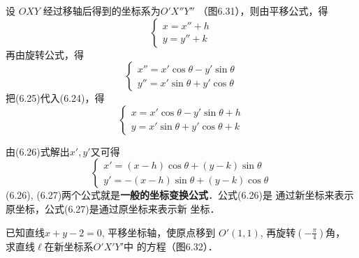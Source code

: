 设 $OXY$ 经过移轴后得到的坐标系为$O'X''Y''$
（图6.31），则由平移公式，得
\begin{equation}
\begin{cases}
    x=x''+h\\
    y=y''+k
\end{cases}
\end{equation}
再由旋转公式，得
\begin{equation}
    \begin{cases}
        x''=x'\cos\theta-y'\sin\theta\\
        y''=x'\sin\theta+y'\cos\theta
    \end{cases}
\end{equation}
把(6.25)代入(6.24)，得
\begin{equation}
    \boxed{\begin{cases}
        x=x'\cos\theta-y'\sin\theta+h\\
        y=x'\sin\theta+y'\cos\theta+k
    \end{cases} } 
\end{equation}

由(6.26)式解出$x',y'$又可得
\begin{equation}
\boxed{\begin{cases}
    x'=(x-h)\cos\theta+(y-k)\sin\theta\\
    y'=-(x-h)\sin\theta+(y-k)\cos\theta
\end{cases} }
\end{equation}
(6.26), (6.27)两个公式就是\textbf{一般的坐标变换公式}．公式(6.26)是
通过新坐标来表示原坐标，公式(6.27)是通过原坐标来表示新
坐标．

\begin{example}
    已知直线$x+y-2=0$, 
平移坐标轴，使原点移到
$O'(1,1)$, 再旋转$\left(-\frac{\pi}{4}\right)$角，
求直线$\ell$在新坐标系$O'X'Y'$中
的方程（图6.32）．
\end{example}

\begin{figure}[htp]
    \centering
{}

    \caption{}
\end{figure}

